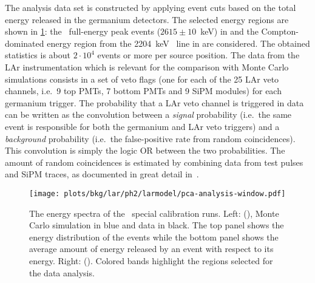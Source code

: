 The analysis data set is constructed by applying event cuts based on the total energy
released in the germanium detectors. The selected energy regions are shown in
\cref{fig:bkg:lar:ph2:pcalib-data}: the \Tl\ full-energy peak events ($2615 \pm 10$~keV)
in  and the Compton-dominated energy region from the 2204~keV \Bih\ line in
 are considered. The obtained statistics is about $2 \cdot 10^4$ events or more
per source position.  The data from the LAr instrumentation which is relevant for the
comparison with Monte Carlo simulations consists in a set of veto flags (one for each of
the 25 LAr veto channels, i.e.~9 top PMTs, 7 bottom PMTs and 9 SiPM modules) for each
germanium trigger.  The probability that a LAr veto channel is triggered in data can be
written as the convolution between a \emph{signal} probability (i.e.~the same event is
responsible for both the germanium and LAr veto triggers) and a \emph{background}
probability (i.e.~the false-positive rate from random coincidences). This convolution is
simply the logic OR between the two probabilities. The amount of random coincidences is
estimated by combining data from test pulses and SiPM traces, as documented in great
detail in~\cite{Wiesinger2021}.

\begin{figure}
  \centering
  \texttt{[image: plots/bkg/lar/ph2/larmodel/pca-analysis-window.pdf]}
  \caption{%
    The energy spectra of the \phasetwo\ special calibration runs. Left:  (\Th),
    Monte Carlo simulation in blue and data in black. The top panel shows the energy
    distribution of the events while the bottom panel shows the average amount of
    energy released by an event with respect to its energy. Right:  (\Ra). Colored
    bands highlight the regions selected for the data analysis.
  }\label{fig:bkg:lar:ph2:pcalib-data}
\end{figure}

